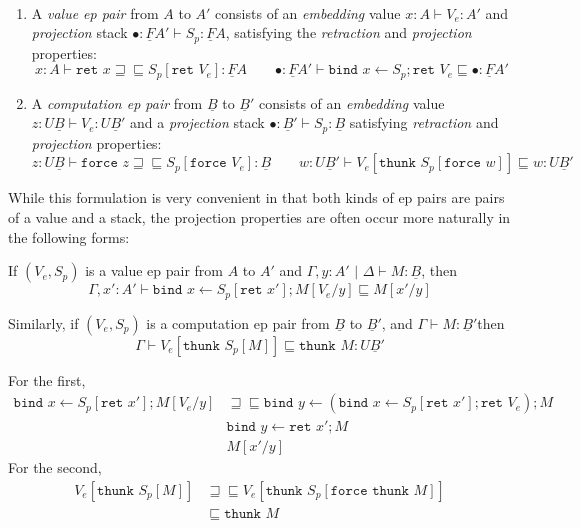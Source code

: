 \documentclass[acmsmall,nonacm]{acmart}
\renewcommand{\u}{\underline}
\newcommand{\pipe}{\,\,|\,\,}
\newcommand{\ltdyn}{\sqsubseteq}
\newcommand{\gtdyn}{\sqsupseteq}
\newcommand{\equidyn}{\mathrel{\gtdyn\ltdyn}}
\newcommand{\bindXtoYinZ}[2]{\kw{bind}#2 \leftarrow #1;}
\newcommand{\kw}[1]{\texttt{#1}\,\,}
\newcommand{\ret}{\kw{ret}}
\newcommand{\thunk}{\kw{thunk}}
\newcommand{\force}{\kw{force}}
\begin{document}
\begin{definition} ~~ \label{def:cbpvstar-eppairs}
  \begin{enumerate}
  \item 
  A \emph{value ep pair} from $A$ to $A'$ consists of
  an \emph{embedding} value $x:A\vdash V_e : A'$
  and \emph{projection} stack $\bullet : \u F A' \vdash S_p : \u F A$,
  satisfying the \emph{retraction} and \emph{projection} properties:
    \[
    x : A \vdash \ret x \equidyn S_p[\ret V_e] : \u F A
    \qquad
    \bullet : \u F A' \vdash \bindXtoYinZ {S_p} x \ret V_e \ltdyn \bullet : \u F A'
    \]
  \item 
  A \emph{computation ep pair} from $\u B$ to $\u B'$ consists of
  an \emph{embedding} value $z : U \u B \vdash V_e : U \u B'$
  and a \emph{projection} stack $\bullet : \u B' \vdash S_p : \u B$
  satisfying \emph{retraction} and \emph{projection} properties:
    \[
    z : U \u B \vdash \force z \equidyn S_p[\force V_e] : \u B
    \qquad
    w : U \u B' \vdash V_e[\thunk {S_p[\force w]}] \ltdyn w : U \u B'
    \]
  \end{enumerate}
\end{definition}

\begin{longonly}
While this formulation is very convenient in that both kinds of ep
pairs are pairs of a value and a stack, the projection properties are
often occur more naturally in the following forms:
\begin{lemma}
  If $(V_e,S_p)$ is a value ep pair from $A$ to $A'$ and $\Gamma,
  y:A'\pipe\Delta \vdash M : \u B$, then
  \[ \Gamma , x' : A' \vdash \bindXtoYinZ {S_p[\ret x']} x M[V_e/y] \ltdyn M[x'/y] \]

  Similarly, if $(V_e,S_p)$ is a computation ep pair from $\u B$ to
  $\u B'$, and $\Gamma \vdash M : \u B'$then
  \[ \Gamma \vdash V_e[\thunk S_p[M]] \ltdyn \thunk M : U \u B' \]
\end{lemma}
\begin{longproof}
  For the first,
  \begin{align*}
    \bindXtoYinZ {S_p[\ret x']} x M[V_e/y]
    & \equidyn
    \bindXtoYinZ {(\bindXtoYinZ {S_p[\ret x']} x \ret V_e)} y M\tag{comm conv, $\u F \beta$}\\
    &\bindXtoYinZ {\ret x'} y M\tag{projection}\\
    &M[x'/y]\tag{$\u F\beta$}
  \end{align*}
  For the second,
  \begin{align*}
    V_e[\thunk S_p[M]]
    &\equidyn V_e[\thunk S_p[\force\thunk M]] \tag{$U\beta$}\\
    &\ltdyn \thunk M\tag{projection}
  \end{align*}
\end{longproof}
\end{longonly}
\end{document}
